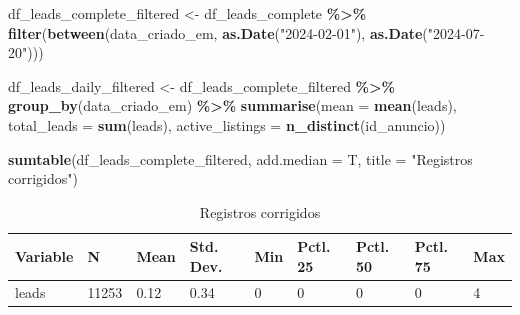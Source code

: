 \documentclass[
]{article}
\newenvironment{Shaded}{\begin{snugshade}}{\end{snugshade}}
\newcommand{\AttributeTok}[1]{\textcolor[rgb]{0.13,0.29,0.53}{#1}}
\newcommand{\FunctionTok}[1]{\textcolor[rgb]{0.13,0.29,0.53}{\textbf{#1}}}
\newcommand{\NormalTok}[1]{#1}
\newcommand{\OtherTok}[1]{\textcolor[rgb]{0.56,0.35,0.01}{#1}}
\newcommand{\SpecialCharTok}[1]{\textcolor[rgb]{0.81,0.36,0.00}{\textbf{#1}}}
\newcommand{\StringTok}[1]{\textcolor[rgb]{0.31,0.60,0.02}{#1}}
\begin{document}
\begin{Shaded}
\begin{Highlighting}[]
\NormalTok{df\_leads\_complete\_filtered }\OtherTok{\textless{}{-}}\NormalTok{ df\_leads\_complete }\SpecialCharTok{\%\textgreater{}\%}
  \FunctionTok{filter}\NormalTok{(}\FunctionTok{between}\NormalTok{(data\_criado\_em, }\FunctionTok{as.Date}\NormalTok{(}\StringTok{"2024{-}02{-}01"}\NormalTok{), }\FunctionTok{as.Date}\NormalTok{(}\StringTok{"2024{-}07{-}20"}\NormalTok{)))}

\NormalTok{df\_leads\_daily\_filtered }\OtherTok{\textless{}{-}}\NormalTok{ df\_leads\_complete\_filtered }\SpecialCharTok{\%\textgreater{}\%}
  \FunctionTok{group\_by}\NormalTok{(data\_criado\_em) }\SpecialCharTok{\%\textgreater{}\%}
  \FunctionTok{summarise}\NormalTok{(}\AttributeTok{mean =} \FunctionTok{mean}\NormalTok{(leads),}
            \AttributeTok{total\_leads =} \FunctionTok{sum}\NormalTok{(leads),}
            \AttributeTok{active\_listings =} \FunctionTok{n\_distinct}\NormalTok{(id\_anuncio))}
\end{Highlighting}
\end{Shaded}

\begin{Shaded}
\begin{Highlighting}[]
\FunctionTok{sumtable}\NormalTok{(df\_leads\_complete\_filtered, }\AttributeTok{add.median =}\NormalTok{ T, }\AttributeTok{title =} \StringTok{"Registros corrigidos"}\NormalTok{)}
\end{Highlighting}
\end{Shaded}

\begin{table}

\caption{\label{tab:unnamed-chunk-9}Registros corrigidos}
\centering
\begin{tabular}[t]{lllllllll}
\toprule
Variable & N & Mean & Std. Dev. & Min & Pctl. 25 & Pctl. 50 & Pctl. 75 & Max\\
\midrule
leads & 11253 & 0.12 & 0.34 & 0 & 0 & 0 & 0 & 4\\
\bottomrule
\end{tabular}
\end{table}
\end{document}
